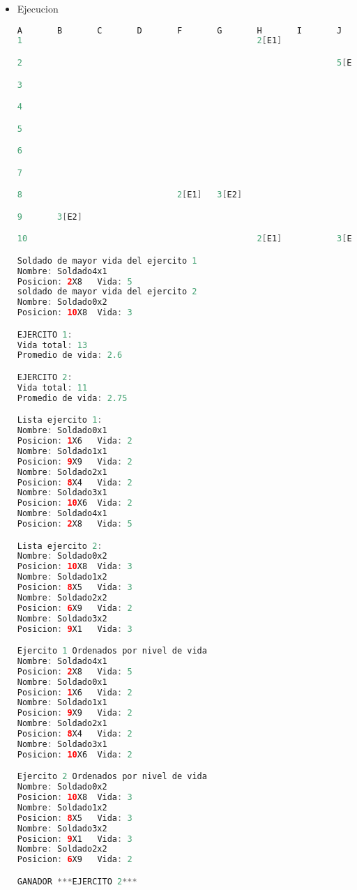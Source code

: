 \documentclass{article}
\begin{document}
\begin{itemize}
\begin{lstlisting}[language=java]
    // Método para morir: cambia el estado del soldado a "no vive"
    public void morir() {
        this.vive = false;
    }

    public void aumentarVida() {
        this.vidaActual++;
    }

}
        \end{lstlisting}

        
        \item Ejecucion
        \begin{lstlisting}[language=java]
            A       B       C       D       F       G       H       I       J
1                                               2[E1]

2                                                               5[E1]

3

4

5

6                                                                       2[E2]

7

8                               2[E1]   3[E2]

9       3[E2]                                                           2[E1]

10                                              2[E1]           3[E2]

Soldado de mayor vida del ejercito 1
Nombre: Soldado4x1
Posicion: 2X8   Vida: 5
soldado de mayor vida del ejercito 2
Nombre: Soldado0x2
Posicion: 10X8  Vida: 3

EJERCITO 1:
Vida total: 13
Promedio de vida: 2.6

EJERCITO 2:
Vida total: 11
Promedio de vida: 2.75

Lista ejercito 1:
Nombre: Soldado0x1
Posicion: 1X6   Vida: 2
Nombre: Soldado1x1
Posicion: 9X9   Vida: 2
Nombre: Soldado2x1
Posicion: 8X4   Vida: 2
Nombre: Soldado3x1
Posicion: 10X6  Vida: 2
Nombre: Soldado4x1
Posicion: 2X8   Vida: 5

Lista ejercito 2:
Nombre: Soldado0x2
Posicion: 10X8  Vida: 3
Nombre: Soldado1x2
Posicion: 8X5   Vida: 3
Nombre: Soldado2x2
Posicion: 6X9   Vida: 2
Nombre: Soldado3x2
Posicion: 9X1   Vida: 3

Ejercito 1 Ordenados por nivel de vida
Nombre: Soldado4x1
Posicion: 2X8   Vida: 5
Nombre: Soldado0x1
Posicion: 1X6   Vida: 2
Nombre: Soldado1x1
Posicion: 9X9   Vida: 2
Nombre: Soldado2x1
Posicion: 8X4   Vida: 2
Nombre: Soldado3x1
Posicion: 10X6  Vida: 2

Ejercito 2 Ordenados por nivel de vida
Nombre: Soldado0x2
Posicion: 10X8  Vida: 3
Nombre: Soldado1x2
Posicion: 8X5   Vida: 3
Nombre: Soldado3x2
Posicion: 9X1   Vida: 3
Nombre: Soldado2x2
Posicion: 6X9   Vida: 2

GANADOR ***EJERCITO 2***
        \end{lstlisting}

    
	\end{itemize}
	
\end{document}
